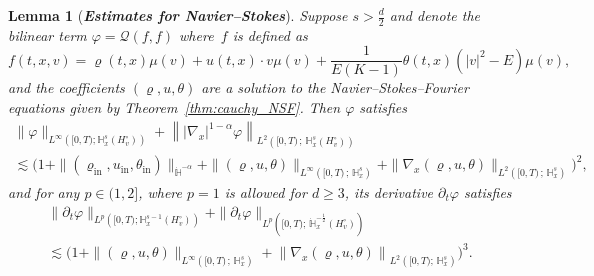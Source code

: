 \documentclass[10pt]{amsart}
\newtheorem{lemm}[theo]{Lemma}\newtheorem{prop}[theo]{Proposition}\newtheorem{coro}[theo]{Corollary}\newtheorem{conj}[theo]{Conjecture}
\theoremstyle{definition}\newtheorem{defi}[theo]{Definition}\newtheorem{rema}[theo]{Remark}\newtheorem{exam}[theo]{Example}\newtheorem{exem}[theo]{Example}\newtheorem{nota}[theo]{Notation}
\newcommand{\ini}{\mathrm{in}}
\newcommand{\bbH}{\mathbb{H}}
\newcommand{\QQ}{\mathcal{Q}}
\newcommand{\Ssm}{H^{\circ}}
\renewcommand*\ge{\geqslant}
\begin{document}
\begin{lemm}[\emph{\textbf{Estimates for Navier--Stokes}}]\label{lem:estimates_derivative_Q_navier_stokes}
Suppose $s > \frac{d}{2}$ and denote the bilinear term $\varphi = \QQ(f, f)$ where~$f$ is defined as
\[
f(t, x, v) = \varrho(t, x) \mu(v) + u(t, x) \cdot v \mu(v) + \frac{1}{E(K-1)} \theta(t, x) \left(|v|^2 - E \right) \mu(v),
\]
and the coefficients $(\varrho, u, \theta)$ are a solution to the Navier--Stokes--Fourier equations given by Theorem~\ref{thm:cauchy_NSF}. Then $\varphi$ satisfies
\begin{multline*}
\| \varphi  \|_{ L^\infty \left([0, T) ; \bbH^s_x \left(\Ssm_v \right) \right) } + \left\| | \nabla_x |^{1-\alpha} \varphi \right\|_{ L^2 \left([0, T)\,;\,\bbH^s_x \left(\Ssm_v \right) \right) } \\
 \lesssim \Big(1 + \| (\varrho_\ini, u_\ini, \theta_\ini) \|_{ \dot{\bbH}^{-\alpha} } + \| (\varrho, u, \theta) \|_{ L^\infty\left([0, T)\,;\,\bbH^{s}_x \right) } + \| \nabla_x (\varrho, u, \theta) \|_{ L^2\left([0, T)\,;\, \bbH^{s}_x \right) }\Big)^2,
\end{multline*}
and for any $p \in (1, 2]$, where $p = 1$ is allowed for $d \ge 3$, its derivative $\partial_{t} \varphi$ satisfies
\begin{multline*}
\| \partial_t \varphi \|_{ L^p\left([0, T) ; \bbH^{s-1}_x(\Ssm_v) \right) }  + \| \partial_t \varphi \|_{ L^p\left([0, T);\,\dot{\bbH}^{-\frac{1}{2}}_x (\Ssm_v)\right) } \\
 \lesssim \Big(1 + \| (\varrho, u, \theta) \|_{ L^\infty\left([0, T)\,;\,\bbH^{s}_x \right) } + \left\| \nabla_x (\varrho, u, \theta) \right\|_{ L^2\left([0, T);\,\bbH^{s}_x \right) }\Big)^3.
\end{multline*}
\end{lemm}
\end{document}
